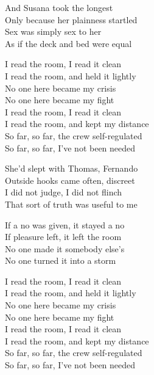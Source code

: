 \begin{lyrics}
And Susana took the longest\\
Only because her plainness startled\\
Sex was simply sex to her\\
As if the deck and bed were equal

I read the room, I read it clean\\
I read the room, and held it lightly\\
No one here became my crisis\\
No one here became my fight\\
I read the room, I read it clean\\
I read the room, and kept my distance\\
So far, so far, the crew self-regulated\\
So far, so far, I’ve not been needed

She’d slept with Thomas, Fernando\\
Outside hooks came often, discreet\\
I did not judge, I did not flinch\\
That sort of truth was useful to me

If a no was given, it stayed a no\\
If pleasure left, it left the room\\
No one made it somebody else’s\\
No one turned it into a storm

I read the room, I read it clean\\
I read the room, and held it lightly\\
No one here became my crisis\\
No one here became my fight\\
I read the room, I read it clean\\
I read the room, and kept my distance\\
So far, so far, the crew self-regulated\\
So far, so far, I’ve not been needed
\end{lyrics}

